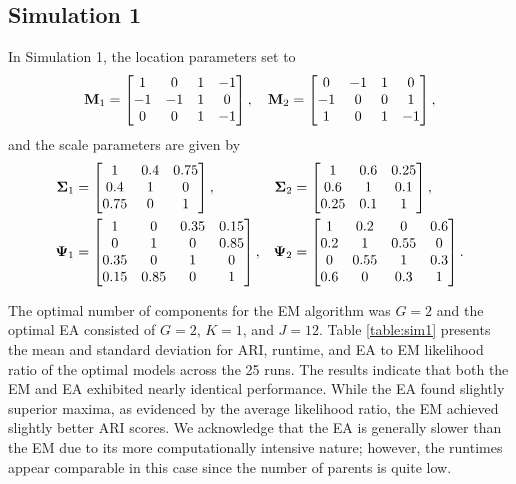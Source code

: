 \documentclass[12pt, centerh1]{article}
\begin{document}
\subsection{Simulation 1}
In Simulation 1, the location parameters set to
$$
{\bf M}_1 =
\begin{bmatrix} 
1  &  0 & 1  & -1 \\
-1 & -1 &  1 & 0\\
 0 & 0  & 1 & -1
\end{bmatrix}, \quad 
{\bf M}_2 =
\begin{bmatrix} 
0  &  -1 & 1  & 0 \\
-1 & 0 &  0 & 1\\
 1 & 0  & 1 & -1
\end{bmatrix},
$$
and the scale parameters are given by
\begin{align*}
{\bf \Sigma}_1 &=
\begin{bmatrix} 
1  &  0.4 & 0.75   \\
0.4 & 1 &  0\\
 0.75 & 0  & 1 
\end{bmatrix}, & 
{\bf \Sigma}_2 &=
\begin{bmatrix} 
1 &  0.6 & 0.25  \\
0.6 & 1 &  0.1 \\
 0.25 & 0.1  & 1 
\end{bmatrix},
\\
{\bf \Psi}_1 &=
\begin{bmatrix} 
      1  &      0 &   0.35  & 0.15 \\
      0 &       1 &    0      & 0.85\\
 0.35 &       0  &   1      & 0\\
 0.15 &   0.85  &   0     & 1
\end{bmatrix}, & 
{\bf \Psi}_2 &=
\begin{bmatrix} 
      1  &      0.2 &     0  & 0.6 \\
      0.2 &       1 &       0.55      & 0\\
      0 &        0.55  &   1      & 0.3\\
   0.6 &       0  &             0.3     & 1
\end{bmatrix}.
\end{align*}

The optimal number of components for the EM algorithm was $G=2$ and the optimal EA consisted of $G=2$, $K=1$, and $J=12$. Table \ref{table:sim1} presents the mean and standard deviation for ARI, runtime, and EA to EM likelihood ratio of the optimal models across the 25 runs. The results indicate that both the EM and EA exhibited nearly identical performance. While the EA found slightly superior maxima, as evidenced by the average likelihood ratio, the EM achieved slightly better ARI scores. We acknowledge that the EA is generally slower than the EM due to its more computationally intensive nature; however, the runtimes appear comparable in this case since the number of parents is quite low.
\end{document}
